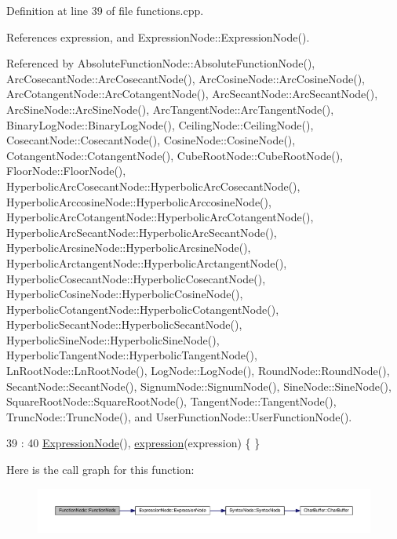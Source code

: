 Definition at line 39 of file functions.\+cpp.



References expression, and Expression\+Node\+::\+Expression\+Node().



Referenced by Absolute\+Function\+Node\+::\+Absolute\+Function\+Node(), Arc\+Cosecant\+Node\+::\+Arc\+Cosecant\+Node(), Arc\+Cosine\+Node\+::\+Arc\+Cosine\+Node(), Arc\+Cotangent\+Node\+::\+Arc\+Cotangent\+Node(), Arc\+Secant\+Node\+::\+Arc\+Secant\+Node(), Arc\+Sine\+Node\+::\+Arc\+Sine\+Node(), Arc\+Tangent\+Node\+::\+Arc\+Tangent\+Node(), Binary\+Log\+Node\+::\+Binary\+Log\+Node(), Ceiling\+Node\+::\+Ceiling\+Node(), Cosecant\+Node\+::\+Cosecant\+Node(), Cosine\+Node\+::\+Cosine\+Node(), Cotangent\+Node\+::\+Cotangent\+Node(), Cube\+Root\+Node\+::\+Cube\+Root\+Node(), Floor\+Node\+::\+Floor\+Node(), Hyperbolic\+Arc\+Cosecant\+Node\+::\+Hyperbolic\+Arc\+Cosecant\+Node(), Hyperbolic\+Arccosine\+Node\+::\+Hyperbolic\+Arccosine\+Node(), Hyperbolic\+Arc\+Cotangent\+Node\+::\+Hyperbolic\+Arc\+Cotangent\+Node(), Hyperbolic\+Arc\+Secant\+Node\+::\+Hyperbolic\+Arc\+Secant\+Node(), Hyperbolic\+Arcsine\+Node\+::\+Hyperbolic\+Arcsine\+Node(), Hyperbolic\+Arctangent\+Node\+::\+Hyperbolic\+Arctangent\+Node(), Hyperbolic\+Cosecant\+Node\+::\+Hyperbolic\+Cosecant\+Node(), Hyperbolic\+Cosine\+Node\+::\+Hyperbolic\+Cosine\+Node(), Hyperbolic\+Cotangent\+Node\+::\+Hyperbolic\+Cotangent\+Node(), Hyperbolic\+Secant\+Node\+::\+Hyperbolic\+Secant\+Node(), Hyperbolic\+Sine\+Node\+::\+Hyperbolic\+Sine\+Node(), Hyperbolic\+Tangent\+Node\+::\+Hyperbolic\+Tangent\+Node(), Ln\+Root\+Node\+::\+Ln\+Root\+Node(), Log\+Node\+::\+Log\+Node(), Round\+Node\+::\+Round\+Node(), Secant\+Node\+::\+Secant\+Node(), Signum\+Node\+::\+Signum\+Node(), Sine\+Node\+::\+Sine\+Node(), Square\+Root\+Node\+::\+Square\+Root\+Node(), Tangent\+Node\+::\+Tangent\+Node(), Trunc\+Node\+::\+Trunc\+Node(), and User\+Function\+Node\+::\+User\+Function\+Node().


\begin{DoxyCode}
39                                                      :
40     \hyperlink{classExpressionNode_adc8888de5329d356224c8a93f3ce2b75}{ExpressionNode}(), \hyperlink{classFunctionNode_ad7577b179a1937aaf8a0058bb5b546dc}{expression}(expression) \{ \}
\end{DoxyCode}


Here is the call graph for this function\+:
\nopagebreak
\begin{figure}[H]
\begin{center}
\leavevmode
\includegraphics[width=350pt]{d7/d06/classFunctionNode_a41cb7db0162ffbec0902bd8ff7ea435f_cgraph}
\end{center}
\end{figure}




